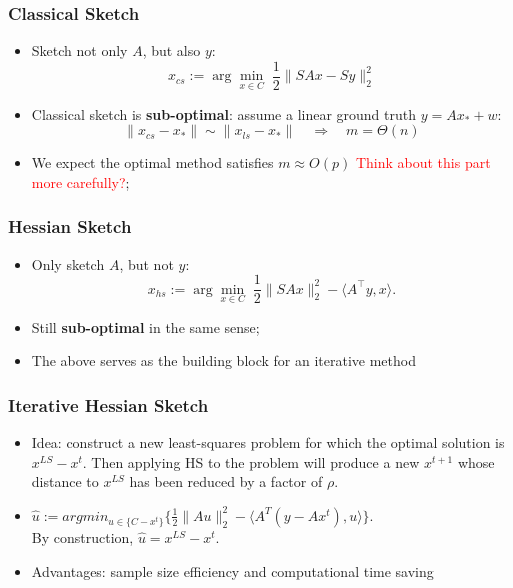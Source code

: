 \documentclass{beamer}
\begin{document}
\begin{frame}
    \frametitle{Classical Sketch}
    
    \begin{itemize}
        \item<1-> Sketch not only $A$, but also $y$:
            \begin{equation*}
                x_{cs} := \arg\min_{x \in C} \; \frac{1}{2} \|SAx-Sy\|^2_2
           \end{equation*}
       \item<2-> Classical sketch is \textbf{sub-optimal}:
           assume a linear ground truth $y = Ax_* + w$:
           \begin{equation*}
               \|x_{cs} - x_*\| \sim \|x_{ls} - x_*\|
               \quad \Rightarrow \quad
               m = \Theta(n)
           \end{equation*}
       \item<3-> We expect the optimal method satisfies $m \approx O(p)$
           \textcolor{red}{Think about this part more carefully?};
    \end{itemize}

\end{frame}

\begin{frame}
    \frametitle{Hessian Sketch}
    \begin{itemize}
        \item<1-> Only sketch $A$, but not $y$:
            \begin{equation*}
                x_{hs} := \arg\min_{x\in C} \; \frac{1}{2} \| S Ax\|^2_2 - \langle A^\top y, x \rangle.
            \end{equation*}
        \item<2-> Still \textbf{sub-optimal} in the same sense;
        \item The above serves as the building block for an iterative method
    \end{itemize}
\end{frame}


\begin{frame}
\frametitle{Iterative Hessian Sketch}
\begin{itemize}
\item Idea: construct a new least-squares problem for which the optimal solution is $x^{LS} - x^t$. Then applying HS to the problem will produce a new $x^{t+1}$ whose distance to $x^{LS}$ has been reduced by a factor of $\rho$.
\item $\hat{u} := argmin_{u \in \{C-x^t\}} \{\frac{1}{2} \| Au\|^2_2 - \langle A^T( y-Ax^t), u \rangle \}.$\\
By construction, $\hat{u} = x^{LS} - x^t$.
\item Advantages: sample size efficiency and computational time saving
\end{itemize}
\end{frame}
\end{document}
